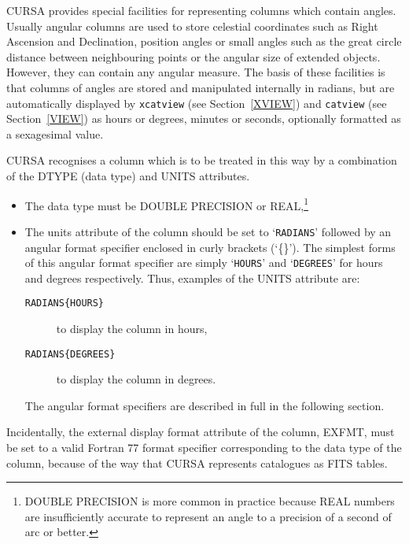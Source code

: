 \documentclass[twoside,11pt]{starlink}
\begin{document}
CURSA provides special facilities for representing columns which
contain angles. Usually angular columns are used to store celestial
coordinates such as Right Ascension and Declination, position angles
or small angles such as the great circle distance between neighbouring
points or the angular size of extended objects.  However, they
can contain any angular measure. The basis of these facilities is that
columns of angles are stored and manipulated internally in radians, but are
automatically displayed by \texttt{xcatview} (see Section~\ref{XVIEW}) and \texttt{catview} (see Section~\ref{VIEW}) as hours or degrees, minutes or seconds,
optionally formatted as a sexagesimal value.

CURSA recognises a column which is to be treated in this way by a
combination of the DTYPE (data type) and UNITS attributes.

\begin{itemize}

  \item The data type must be DOUBLE PRECISION or
   REAL,\footnote{DOUBLE PRECISION is more common in practice because
   REAL numbers are insufficiently accurate to represent an angle to
   a precision of a second of arc or better.}

  \item The units attribute of the column should be set to
   `\texttt{RADIANS}' followed by an angular format specifier
   enclosed in curly brackets (`\{\}'). The simplest forms of this
   angular format specifier are simply `\texttt{HOURS}' and `\texttt{DEGREES}' for hours and degrees respectively. Thus, examples of
   the UNITS attribute are:

  \begin{description}

    \item[\texttt{RADIANS\{HOURS\}}] to display the column in hours,

    \item[\texttt{RADIANS\{DEGREES\}}] to display the column in degrees.

  \end{description}

   The angular format specifiers are described in full in the following
   section.

\end{itemize}

Incidentally, the external display format attribute of the column, EXFMT,
must be set to a valid Fortran 77 format specifier corresponding to the
data type of the column, because of the way that CURSA represents
catalogues as FITS tables.
\end{document}
